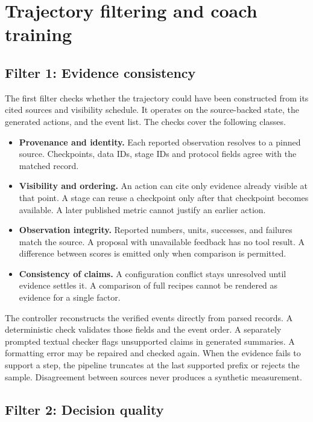 \documentclass{article}
\begin{document}
\section{Trajectory filtering and coach training}
\label{sec:filter}

\subsection{Filter 1: Evidence consistency}

The first filter checks whether the trajectory could have been constructed from its cited sources and visibility schedule. It operates on the source-backed state, the generated actions, and the event list. The checks cover the following classes.

\begin{itemize}
  \item \textbf{Provenance and identity.} Each reported observation resolves to a pinned source. Checkpoints, data IDs, stage IDs and protocol fields agree with the matched record.
  \item \textbf{Visibility and ordering.} An action can cite only evidence already visible at that point. A stage can reuse a checkpoint only after that checkpoint becomes available. A later published metric cannot justify an earlier action.
  \item \textbf{Observation integrity.} Reported numbers, units, successes, and failures match the source. A proposal with unavailable feedback has no tool result. A difference between scores is emitted only when comparison is permitted.
  \item \textbf{Consistency of claims.} A configuration conflict stays unresolved until evidence settles it. A comparison of full recipes cannot be rendered as evidence for a single factor.
\end{itemize}

The controller reconstructs the verified events directly from parsed records. A deterministic check validates those fields and the event order. A separately prompted textual checker flags unsupported claims in generated summaries. A formatting error may be repaired and checked again. When the evidence fails to support a step, the pipeline truncates at the last supported prefix or rejects the sample. Disagreement between sources never produces a synthetic measurement.

\subsection{Filter 2: Decision quality}
\end{document}
